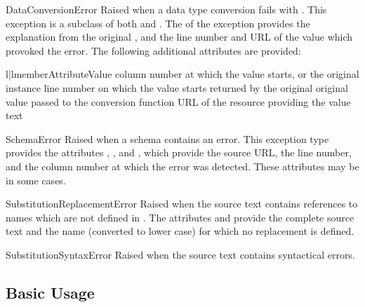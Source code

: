 \documentclass{howto}
\begin{document}
\begin{excdesc}{DataConversionError}
  Raised when a data type conversion fails with
  .  This exception is a subclass of both
   and .  The
   of the exception provides the explanation from the
  original , and the line number and URL of the
  value which provoked the error.  The following additional attributes
  are provided:

  \begin{tableii}{l|l}{member}{Attribute}{Value}
           {column number at which the value starts, or }
           {the original  instance}
           {line number on which the value starts}
           { returned by the original }
           {original value passed to the conversion function}
           {URL of the resource providing the value text}
  \end{tableii}
\end{excdesc}

\begin{excdesc}{SchemaError}
  Raised when a schema contains an error.  This exception type
  provides the attributes , , and
  , which provide the source URL, the line number, and
  the column number at which the error was detected.  These attributes
  may be  in some cases.
\end{excdesc}

\begin{excdesc}{SubstitutionReplacementError}
  Raised when the source text contains references to names which are
  not defined in .  The attributes  and
   provide the complete source text and the name
  (converted to lower case) for which no replacement is defined.
\end{excdesc}

\begin{excdesc}{SubstitutionSyntaxError}
  Raised when the source text contains syntactical errors.
\end{excdesc}


\subsection{Basic Usage}
\end{document}
